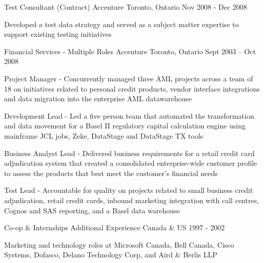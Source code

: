 \begin{cventries}
  \cventry
    {Test Consultant (Contract)} %
    {Accenture} %
    {Toronto, Ontario} %
    {Nov 2008 - Dec 2008} %
    {
      \begin{cvitems} %
        \item {Developed a test data strategy and served as a subject matter expertise to support existing testing initiatives}
      \end{cvitems}
    }

  \cventry
    {Financial Services - Multiple Roles} %
    {Accenture} %
    {Toronto, Ontario} %
    {Sept 2003 – Oct 2008} %
    {
      \begin{cvitems} %
        \item {Project Manager - Concurrently managed three AML projects across a team of 18 on initiatives related to personal credit products, vendor interface integrations and data migration into the enterprise AML datawarehouse}
        \item {Development Lead - Led a five person team that automated the transformation and data movement for a Basel II regulatory capital calculation engine using mainframe JCL jobs, Zeke, DataStage and DataStage TX tools}
        \item {Business Analyst Lead - Delivered business requirements for a retail credit card adjudication system that created a consolidated enterprise-wide customer profile to assess the products that best meet the customer's financial needs}
        \item {Test Lead - Accountable for quality on projects related to small business credit adjudication, retail credit cards, inbound marketing integration with call centres, Cognos and SAS reporting, and a Basel data warehouse}
      \end{cvitems}
    }

  \cventry
    {Co-op \& Internships} %
    {Additional Experience} %
    {Canada \& US} %
    {1997 - 2002} %
    {
      \begin{cvitems} %
        \item {Marketing and technology roles at Microsoft Canada, Bell Canada, Cisco Systems, Dofasco, Delano Technology Corp, and Aird \& Berlis LLP}
      \end{cvitems}
    }

\end{cventries}
